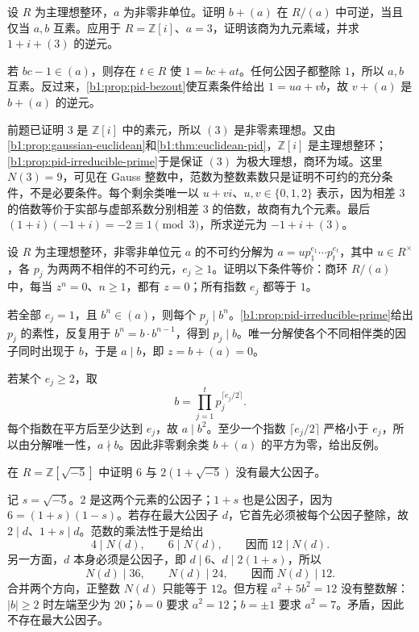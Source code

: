 \begin{exercise}\label{b1:ex:11-quotient-inverse}
	设 \(R\) 为主理想整环，\(a\) 为非零非单位。证明 \(b+(a)\) 在 \(R/(a)\) 中可逆，当且仅当 \(a,b\) 互素。应用于 \(R=\mathbb Z[i]\)、\(a=3\)，证明该商为九元素域，并求 \(1+i+(3)\) 的逆元。
\end{exercise}
\begin{solution}
	若 \(bc-1\in(a)\)，则存在 \(t\in R\) 使 \(1=bc+at\)。任何公因子都整除 \(1\)，所以 \(a,b\) 互素。反过来，\cref{b1:prop:pid-bezout}使互素条件给出 \(1=ua+vb\)，故 \(v+(a)\) 是 \(b+(a)\) 的逆元。

	前题已证明 \(3\) 是 \(\mathbb Z[i]\) 中的素元，所以 \((3)\) 是非零素理想。又由\cref{b1:prop:gaussian-euclidean}和\cref{b1:thm:euclidean-pid}，\(\mathbb Z[i]\) 是主理想整环；\cref{b1:prop:pid-irreducible-prime}于是保证 \((3)\) 为极大理想，商环为域。这里 \(N(3)=9\)，可见在 Gauss 整数中，范数为整数素数只是证明不可约的充分条件，不是必要条件。每个剩余类唯一以 \(u+vi\)、\(u,v\in\{0,1,2\}\) 表示，因为相差 \(3\) 的倍数等价于实部与虚部系数分别相差 \(3\) 的倍数，故商有九个元素。最后 \((1+i)(-1+i)=-2\equiv1\pmod3\)，所求逆元为 \(-1+i+(3)\)。
\end{solution}

\begin{exercise}\label{b1:ex:11-squarefree-quotient}
	设 \(R\) 为主理想整环，非零非单位元 \(a\) 的不可约分解为 \(a=u p_1^{e_1}\cdots p_t^{e_t}\)，其中 \(u\in R^\times\)，各 \(p_j\) 为两两不相伴的不可约元，\(e_j\geq1\)。证明以下条件等价：商环 \(R/(a)\) 中，每当 \(z^n=0\)、\(n\geq1\)，都有 \(z=0\)；所有指数 \(e_j\) 都等于 \(1\)。
\end{exercise}
\begin{solution}
	若全部 \(e_j=1\)，且 \(b^n\in(a)\)，则每个 \(p_j\mid b^n\)。\cref{b1:prop:pid-irreducible-prime}给出 \(p_j\) 的素性，反复用于 \(b^n=b\cdot b^{n-1}\)，得到 \(p_j\mid b\)。唯一分解使各个不同相伴类的因子同时出现于 \(b\)，于是 \(a\mid b\)，即 \(z=b+(a)=0\)。

	若某个 \(e_j\geq2\)，取
	\[
		b=\prod_{j=1}^{t}p_j^{\lceil e_j/2\rceil}.
	\]
	每个指数在平方后至少达到 \(e_j\)，故 \(a\mid b^2\)。至少一个指数 \(\lceil e_j/2\rceil\) 严格小于 \(e_j\)，所以由分解唯一性，\(a\nmid b\)。因此非零剩余类 \(b+(a)\) 的平方为零，给出反例。
\end{solution}

\begin{exercise}\label{b1:ex:11-no-gcd}
	在 \(R=\mathbb Z[\sqrt{-5}]\) 中证明 \(6\) 与 \(2(1+\sqrt{-5})\) 没有最大公因子。
\end{exercise}
\begin{solution}
	记 \(s=\sqrt{-5}\)。\(2\) 是这两个元素的公因子；\(1+s\) 也是公因子，因为 \(6=(1+s)(1-s)\)。若存在最大公因子 \(d\)，它首先必须被每个公因子整除，故 \(2\mid d\)、\(1+s\mid d\)。范数的乘法性于是给出
	\[
		4\mid N(d),\qquad6\mid N(d),\qquad\text{因而}\;12\mid N(d).
	\]
	另一方面，\(d\) 本身必须是公因子，即 \(d\mid6\)、\(d\mid2(1+s)\)，所以
	\[
		N(d)\mid36,\qquad N(d)\mid24,\qquad\text{因而}\;N(d)\mid12.
	\]
	合并两个方向，正整数 \(N(d)\) 只能等于 \(12\)。但方程 \(a^2+5b^2=12\) 没有整数解：\(\lvert b\rvert\geq2\) 时左端至少为 \(20\)；\(b=0\) 要求 \(a^2=12\)；\(b=\pm1\) 要求 \(a^2=7\)。矛盾，因此不存在最大公因子。
\end{solution}

